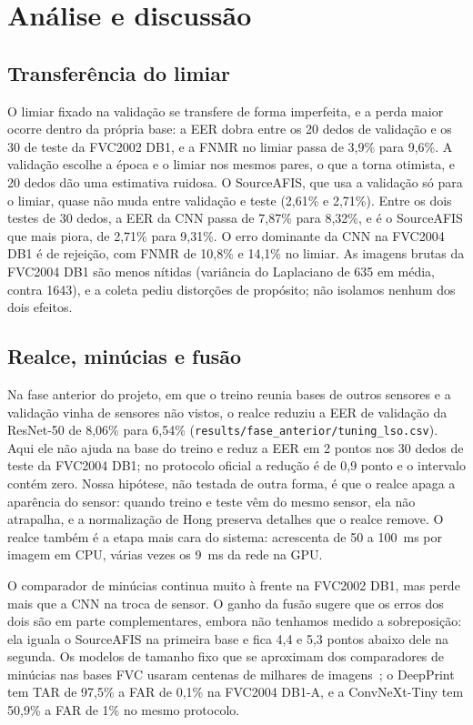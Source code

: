 \documentclass[conference]{IEEEtran}
\begin{document}
\section{Análise e discussão}
\label{sec:discussao}

\subsection{Transferência do limiar}

O limiar fixado na validação se transfere de forma imperfeita, e a perda maior ocorre dentro da própria base: a EER dobra entre os 20 dedos de validação e os 30 de teste da FVC2002 DB1, e a FNMR no limiar passa de 3,9\% para 9,6\%. A validação escolhe a época e o limiar nos mesmos pares, o que a torna otimista, e 20 dedos dão uma estimativa ruidosa. O SourceAFIS, que usa a validação só para o limiar, quase não muda entre validação e teste (2,61\% e 2,71\%). Entre os dois testes de 30 dedos, a EER da CNN passa de 7,87\% para 8,32\%, e é o SourceAFIS que mais piora, de 2,71\% para 9,31\%. O erro dominante da CNN na FVC2004 DB1 é de rejeição, com FNMR de 10,8\% e 14,1\% no limiar. As imagens brutas da FVC2004 DB1 são menos nítidas (variância do Laplaciano de 635 em média, contra \num{1643}), e a coleta pediu distorções de propósito; não isolamos nenhum dos dois efeitos.

\subsection{Realce, minúcias e fusão}

Na fase anterior do projeto, em que o treino reunia bases de outros sensores e a validação vinha de sensores não vistos, o realce reduziu a EER de validação da ResNet-50 de 8,06\% para 6,54\% (\texttt{results/fase\_anterior/tuning\_lso.csv}). Aqui ele não ajuda na base do treino e reduz a EER em 2 pontos nos 30 dedos de teste da FVC2004 DB1; no protocolo oficial a redução é de 0,9 ponto e o intervalo contém zero. Nossa hipótese, não testada de outra forma, é que o realce apaga a aparência do sensor: quando treino e teste vêm do mesmo sensor, ela não atrapalha, e a normalização de Hong preserva detalhes que o realce remove. O realce também é a etapa mais cara do sistema: acrescenta de 50 a 100~ms por imagem em CPU, várias vezes os 9~ms da rede na GPU.

O comparador de minúcias continua muito à frente na FVC2002 DB1, mas perde mais que a CNN na troca de sensor. O ganho da fusão sugere que os erros dos dois são em parte complementares, embora não tenhamos medido a sobreposição: ela iguala o SourceAFIS na primeira base e fica 4,4 e 5,3 pontos abaixo dele na segunda. Os modelos de tamanho fixo que se aproximam dos comparadores de minúcias nas bases FVC usaram centenas de milhares de imagens~\cite{engelsma2021deepprint,grosz2024afrnet}; o DeepPrint tem TAR de 97,5\% a FAR de 0,1\% na FVC2004 DB1-A, e a ConvNeXt-Tiny tem 50,9\% a FAR de 1\% no mesmo protocolo.
\end{document}
